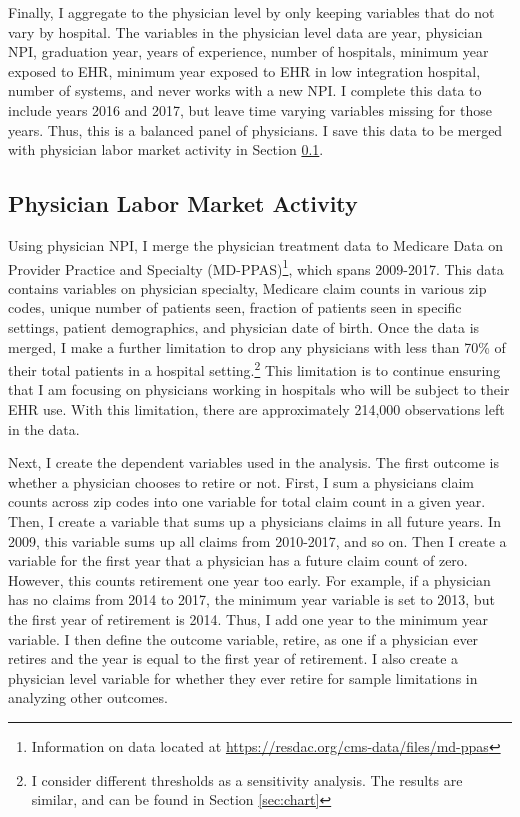 \documentclass[12pt]{article}
\begin{document}
Finally, I aggregate to the physician level by only keeping variables that do not vary by hospital. The variables in the physician level data are year, physician NPI, graduation year, years of experience, number of hospitals, minimum year exposed to EHR, minimum year exposed to EHR in low integration hospital, number of systems, and never works with a new NPI. I complete this data to include years 2016 and 2017, but leave time varying variables missing for those years. Thus, this is a balanced panel of physicians. I save this data to be merged with physician labor market activity in Section \ref{sec:appmdppas}.

\subsection{Physician Labor Market Activity}\label{sec:appmdppas}

Using physician NPI, I merge the physician treatment data to Medicare Data on Provider Practice and Specialty (MD-PPAS)\footnote{Information on data located at \hyperlink{https://resdac.org/cms-data/files/md-ppas}{https://resdac.org/cms-data/files/md-ppas}}, which spans 2009-2017. This data contains variables on physician specialty, Medicare claim counts in various zip codes, unique number of patients seen, fraction of patients seen in specific settings, patient demographics, and physician date of birth. Once the data is merged, I make a further limitation to drop any physicians with less than 70\% of their total patients in a hospital setting.\footnote{I consider different thresholds as a sensitivity analysis. The results are similar, and can be found in Section \ref{sec:chart}} This limitation is to continue ensuring that I am focusing on physicians working in hospitals who will be subject to their EHR use. With this limitation, there are approximately 214,000 observations left in the data. 

Next, I create the dependent variables used in the analysis. The first outcome is whether a physician chooses to retire or not. First, I sum a physicians claim counts across zip codes into one variable for total claim count in a given year. Then, I create a variable that sums up a physicians claims in all future years. In 2009, this variable sums up all claims from 2010-2017, and so on. Then I create a variable for the first year that a physician has a future claim count of zero. However, this counts retirement one year too early. For example, if a physician has no claims from 2014 to 2017, the minimum year variable is set to 2013, but the first year of retirement is 2014. Thus, I add one year to the minimum year variable. I then define the outcome variable, retire, as one if a physician ever retires and the year is equal to the first year of retirement. I also create a physician level variable for whether they ever retire for sample limitations in analyzing other outcomes. 
\end{document}
